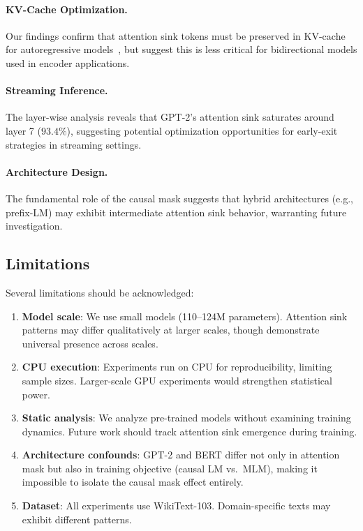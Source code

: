 \documentclass{article}
\begin{document}
\paragraph{KV-Cache Optimization.} Our findings confirm that attention sink tokens must be preserved in KV-cache for autoregressive models~\citep{xiao2023efficient}, but suggest this is less critical for bidirectional models used in encoder applications.

\paragraph{Streaming Inference.} The layer-wise analysis reveals that GPT-2's attention sink saturates around layer 7 ($93.4\%$), suggesting potential optimization opportunities for early-exit strategies in streaming settings.

\paragraph{Architecture Design.} The fundamental role of the causal mask suggests that hybrid architectures (e.g., prefix-LM) may exhibit intermediate attention sink behavior, warranting future investigation.

\subsection{Limitations}

Several limitations should be acknowledged:

\begin{enumerate}
    \item \textbf{Model scale}: We use small models (110--124M parameters). Attention sink patterns may differ qualitatively at larger scales, though \citet{gu2024attention} demonstrate universal presence across scales.
    \item \textbf{CPU execution}: Experiments run on CPU for reproducibility, limiting sample sizes. Larger-scale GPU experiments would strengthen statistical power.
    \item \textbf{Static analysis}: We analyze pre-trained models without examining training dynamics. Future work should track attention sink emergence during training.
    \item \textbf{Architecture confounds}: GPT-2 and BERT differ not only in attention mask but also in training objective (causal LM vs.\ MLM), making it impossible to isolate the causal mask effect entirely.
    \item \textbf{Dataset}: All experiments use WikiText-103. Domain-specific texts may exhibit different patterns.
\end{enumerate}
\end{document}
